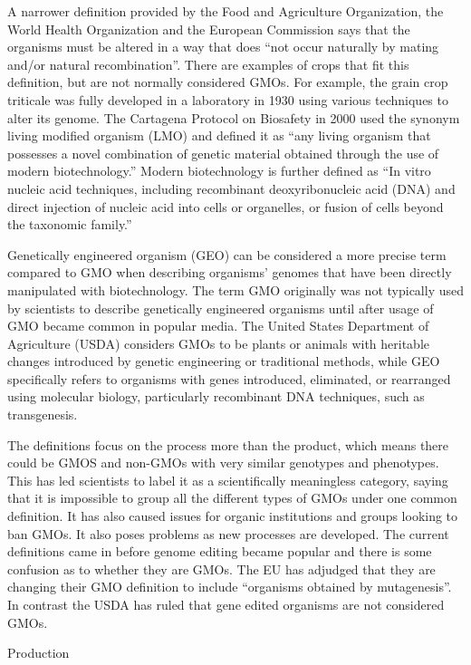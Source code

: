 A narrower definition provided by the Food and Agriculture Organization, the World Health Organization and the European Commission says that the organisms must be altered in a way that does ``not occur naturally by mating and/or natural recombination''. There are examples of crops that fit this definition, but are not normally considered GMOs. For example, the grain crop triticale was fully developed in a laboratory in 1930 using various techniques to alter its genome. The Cartagena Protocol on Biosafety in 2000 used the synonym living modified organism (LMO) and defined it as ``any living organism that possesses a novel combination of genetic material obtained through the use of modern biotechnology.'' Modern biotechnology is further defined as ``In vitro nucleic acid techniques, including recombinant deoxyribonucleic acid (DNA) and direct injection of nucleic acid into cells or organelles, or fusion of cells beyond the taxonomic family.''

Genetically engineered organism (GEO) can be considered a more precise term compared to GMO when describing organisms' genomes that have been directly manipulated with biotechnology. The term GMO originally was not typically used by scientists to describe genetically engineered organisms until after usage of GMO became common in popular media. The United States Department of Agriculture (USDA) considers GMOs to be plants or animals with heritable changes introduced by genetic engineering or traditional methods, while GEO specifically refers to organisms with genes introduced, eliminated, or rearranged using molecular biology, particularly recombinant DNA techniques, such as transgenesis.

The definitions focus on the process more than the product, which means there could be GMOS and non-GMOs with very similar genotypes and phenotypes. This has led scientists to label it as a scientifically meaningless category, saying that it is impossible to group all the different types of GMOs under one common definition. It has also caused issues for organic institutions and groups looking to ban GMOs. It also poses problems as new processes are developed. The current definitions came in before genome editing became popular and there is some confusion as to whether they are GMOs. The EU has adjudged that they are changing their GMO definition to include ``organisms obtained by mutagenesis''. In contrast the USDA has ruled that gene edited organisms are not considered GMOs.

Production


